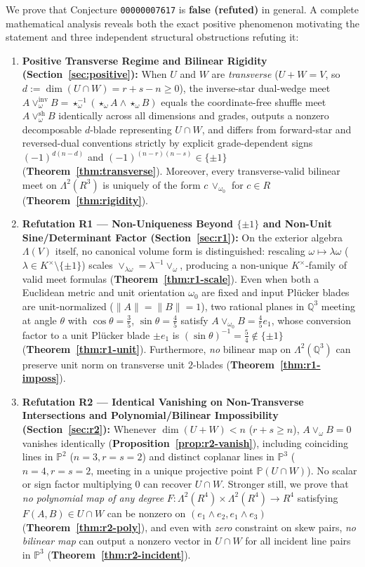 \documentclass[11pt]{article}
\theoremstyle{definition}
\newcommand{\Psp}{\mathbb{P}}
\begin{document}
We prove that Conjecture \texttt{00000007617} is \textbf{false (refuted)} in general. A complete mathematical analysis reveals both the exact positive phenomenon motivating the statement and three independent structural obstructions refuting it:
\begin{enumerate}
  \item \textbf{Positive Transverse Regime and Bilinear Rigidity (Section~\ref{sec:positive}):} When $U$ and $W$ are \emph{transverse} ($U + W = V$, so $d := \dim(U \cap W) = r + s - n \ge 0$), the inverse-star dual-wedge meet $A \vee_\omega^{\mathrm{inv}} B = \star_\omega^{-1}(\star_\omega A \wedge \star_\omega B)$ equals the coordinate-free shuffle meet $A \vee_\omega^{\mathrm{sh}} B$ identically across all dimensions and grades, outputs a nonzero decomposable $d$-blade representing $U \cap W$, and differs from forward-star and reversed-dual conventions strictly by explicit grade-dependent signs $(-1)^{d(n-d)}$ and $(-1)^{(n-r)(n-s)} \in \{\pm 1\}$ (\textbf{Theorem~\ref{thm:transverse}}). Moreover, every transverse-valid bilinear meet on $\Lambda^2(R^3)$ is uniquely of the form $c\,\vee_{\omega_0}$ for $c \in R$ (\textbf{Theorem~\ref{thm:rigidity}}).
  \item \textbf{Refutation R1 --- Non-Uniqueness Beyond $\{\pm 1\}$ and Non-Unit Sine/Determinant Factor (Section~\ref{sec:r1}):} On the exterior algebra $\Lambda(V)$ itself, no canonical volume form is distinguished: rescaling $\omega \mapsto \lambda\omega$ ($\lambda \in K^\times \setminus \{\pm 1\}$) scales $\vee_{\lambda\omega} = \lambda^{-1}\vee_\omega$, producing a non-unique $K^\times$-family of valid meet formulas (\textbf{Theorem~\ref{thm:r1-scale}}). Even when both a Euclidean metric and unit orientation $\omega_0$ are fixed and input Pl\"ucker blades are unit-normalized ($\|A\| = \|B\| = 1$), two rational planes in $\mathbb{Q}^3$ meeting at angle $\theta$ with $\cos\theta = \frac{3}{5}$, $\sin\theta = \frac{4}{5}$ satisfy $A \vee_{\omega_0} B = \frac{4}{5}e_1$, whose conversion factor to a unit Pl\"ucker blade $\pm e_1$ is $(\sin\theta)^{-1} = \frac{5}{4} \notin \{\pm 1\}$ (\textbf{Theorem~\ref{thm:r1-unit}}). Furthermore, \emph{no} bilinear map on $\Lambda^2(\mathbb{Q}^3)$ can preserve unit norm on transverse unit $2$-blades (\textbf{Theorem~\ref{thm:r1-imposs}}).
  \item \textbf{Refutation R2 --- Identical Vanishing on Non-Transverse Intersections and Polynomial/Bilinear Impossibility (Section~\ref{sec:r2}):} Whenever $\dim(U + W) < n$ ($r + s \ge n$), $A \vee_\omega B = 0$ vanishes identically (\textbf{Proposition~\ref{prop:r2-vanish}}), including coinciding lines in $\Psp^2$ ($n=3, r=s=2$) and distinct coplanar lines in $\Psp^3$ ($n=4, r=s=2$, meeting in a unique projective point $\Psp(U \cap W)$). No scalar or sign factor multiplying $0$ can recover $U \cap W$. Stronger still, we prove that \emph{no polynomial map of any degree} $F : \Lambda^2(R^4) \times \Lambda^2(R^4) \to R^4$ satisfying $F(A,B) \in U \cap W$ can be nonzero on $(e_1\wedge e_2, e_1\wedge e_3)$ (\textbf{Theorem~\ref{thm:r2-poly}}), and even with \emph{zero} constraint on skew pairs, \emph{no bilinear map} can output a nonzero vector in $U \cap W$ for all incident line pairs in $\Psp^3$ (\textbf{Theorem~\ref{thm:r2-incident}}).

\end{enumerate}
\end{document}
